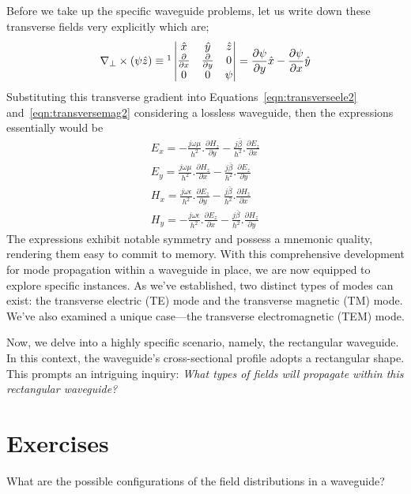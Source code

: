 Before we take up the specific waveguide problems, let us write down these transverse fields very explicitly which are;
\begin{dmath*}
\nabla_\bot\times(\psi\hat{z}) \equiv 
\footnotemark\begin{vmatrix}
\hat{x} & \hat{y} &\hat{z}\\
\partialderivative{}{x} & \partialderivative{}{y} & 0\\
0 & 0 & \psi
\end{vmatrix} = \frac{\partial\psi}{\partial y}\hat{x} - \frac{\partial\psi}{\partial x}\hat{y}
\end{dmath*}
Substituting this transverse gradient into Equations~\eqref{eqn:transverseele2} and~\eqref{eqn:transversemag2} considering a lossless waveguide, then the expressions essentially would be
\begin{align}
E_x = -\frac{j\omega\mu}{h^2}.\frac{\partial H_z}{\partial y} - \frac{j\bar{\beta}}{h^2}.\frac{\partial E_z}{\partial x}
\label{eqn:transverseex}\\
E_y = \frac{j\omega\mu}{h^2}.\frac{\partial H_z}{\partial x} - \frac{j\bar{\beta}}{h^2}.\frac{\partial E_z}{\partial y}
\label{eqn:transverseey}\\
H_x = \frac{j\omega\epsilon}{h^2}.\frac{\partial E_z}{\partial y} - \frac{j\bar{\beta}}{h^2}.\frac{\partial H_z}{\partial x}
\label{eqn:transversehx}\\
H_y = -\frac{j\omega\epsilon}{h^2}.\frac{\partial E_z}{\partial x} - \frac{j\bar{\beta}}{h^2}.\frac{\partial H_z}{\partial y}
\label{eqn:transversehy}
\end{align}
The expressions exhibit notable symmetry and possess a mnemonic quality, rendering them easy to commit to memory. With this comprehensive development for mode propagation within a waveguide in place, we are now equipped to explore specific instances. As we've established, two distinct types of modes can exist: the transverse electric (TE) mode and the transverse magnetic (TM) mode. We've also examined a unique case—the transverse electromagnetic (TEM) mode. 

Now, we delve into a highly specific scenario, namely, the rectangular waveguide. In this context, the waveguide's cross-sectional profile adopts a rectangular shape. This prompts an intriguing inquiry: \emph{What types of fields will propagate within this rectangular waveguide?}

\section*{Exercises}
\begin{ExerciseList}
\Exercise[label={ex371}]
What are the possible configurations of the field distributions in a waveguide?
\end{ExerciseList}
